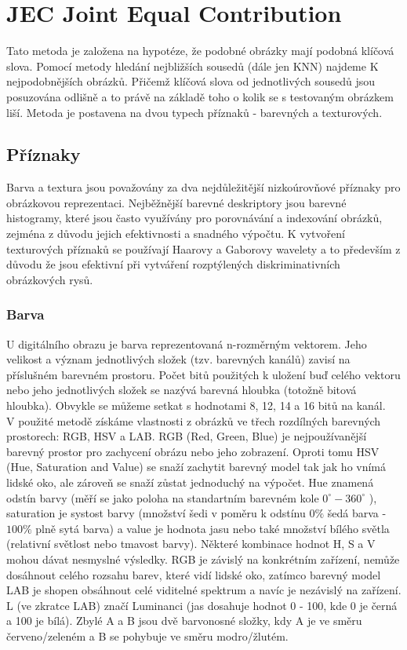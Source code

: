 \documentclass[czech,BP]{thesiskiv}
\begin{document}
\chapter{JEC Joint Equal Contribution}
Tato metoda je založena na hypotéze, že podobné obrázky mají podobná klíčová slova. Pomocí metody hledání nejbližších sousedů (dále jen KNN) najdeme K nejpodobnějších obrázků. Přičemž klíčová slova od jednotlivých sousedů jsou posuzována odlišně a to právě na základě toho o kolik se s testovaným obrázkem liší. Metoda je postavena na dvou typech příznaků - barevných a texturových. 
\cite{JEC}

\section{Příznaky}
Barva a textura jsou považovány za dva nejdůležitější nizkoúrovňové příznaky pro obrázkovou reprezentaci. Nejběžnější barevné deskriptory jsou barevné histogramy, které jsou často využívány pro porovnávání a indexování obrázků, zejména z důvodu jejich efektivnosti a snadného výpočtu. K vytvoření texturových příznaků se používají Haarovy a Gaborovy wavelety a to především z důvodu že jsou efektivní při vytváření rozptýlených diskriminativních obrázkových rysů.  

\subsection{Barva}
U digitálního obrazu je barva reprezentovaná n-rozměrným vektorem. Jeho velikost a význam jednotlivých složek (tzv. barevných kanálů) zavisí na příslušném barevném prostoru. Počet bitů použitých k uložení buď celého vektoru nebo jeho jednotlivých složek se nazývá barevná hloubka (totožně bitová hloubka). Obvykle se můžeme setkat s hodnotami 8, 12, 14 a 16 bitů na kanál. 
\\
V použité metodě získáme vlastnosti z obrázků ve třech rozdílných barevných prostorech: RGB, HSV a LAB. RGB (Red, Green, Blue) je nejpoužívanější barevný prostor pro zachycení obrázu nebo jeho zobrazení. Oproti tomu HSV (Hue, Saturation and Value) se snaží zachytit barevný model tak jak ho vnímá lidské oko, ale zároveň se snaží zůstat jednoduchý na výpočet. Hue znamená odstín barvy (měří se jako poloha na standartním barevném kole $0^{\circ} - 360^{\circ}$ ), saturation je systost barvy (množství šedi v poměru k odstínu $0 \%$ šedá barva - $100 \%$ plně sytá barva) a value je hodnota jasu nebo také množství bílého světla (relativní světlost nebo tmavost barvy). Některé kombinace hodnot H, S a V mohou dávat nesmyslné výsledky. RGB je závislý na konkrétním zařízení, nemůže dosáhnout celého rozsahu barev, které vidí lidské oko, zatímco barevný model LAB je shopen obsáhnout celé viditelné spektrum a navíc je nezávislý na zařízení. L (ve zkratce LAB) značí Luminanci (jas dosahuje hodnot 0 - 100, kde 0 je černá a 100 je bílá). Zbylé A a B jsou dvě barvonosné složky, kdy A je ve směru červeno/zeleném a B se pohybuje ve směru modro/žlutém.
\end{document}
